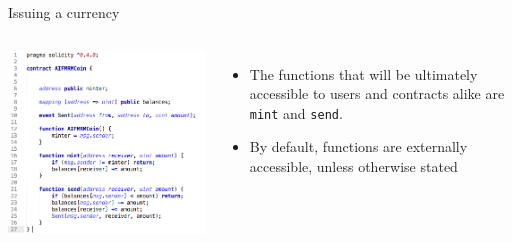 \documentclass[9pt]{beamer}
\begin{document}
\begin{frame}{Issuing a currency}
	\begin{columns}
	    \includegraphics  [scale=0.3]{Images/contract5}

	    \begin{itemize}
			\item The functions that will be ultimately accessible to users and contracts alike are \texttt{mint} and \texttt{send}.
			\item By default, functions are externally accessible, unless otherwise stated
	    \end{itemize}
	\end{columns}
\end{frame}

\end{document}
